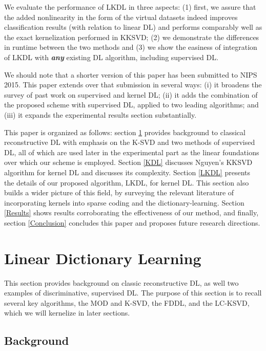 \documentclass[journal]{IEEEtran}
\begin{document}
We evaluate the performance of LKDL in three aspects: (1) first, we assure that the added nonlinearity in the form of the virtual datasets indeed improves classification results (with relation to linear DL) and performs comparably well as the exact kernelization performed in KKSVD; (2) we demonstrate the differences in runtime between the two methods and (3) we show the easiness of integration of LKDL with \textit{\textbf{any}} existing DL algorithm, including supervised DL.

We should note that a shorter version of this paper has been submitted to NIPS 2015. This paper extends over that submission in several ways: (i) it broadens the survey  of past work on supervised and kernel DL; (ii) it adds the combination of the proposed scheme with supervised DL, applied to two leading algorithms; and (iii) it expands the experimental results section substantially.

This paper is organized as follows: section \ref{linearDL} provides background to classical reconstructive DL with emphasis on the K-SVD and two methods of supervised DL, all of which are used later in the experimental part as the linear foundations over which our scheme is employed.  Section \ref{KDL} discusses Nguyen's KKSVD algorithm for kernel DL and discusses its complexity. Section \ref{LKDL} presents the details of our proposed algorithm, LKDL, for kernel DL. This section also builds a wider picture of this field, by surveying the relevant literature of incorporating kernels into sparse coding and the dictionary-learning.
Section \ref{Results} shows results corroborating the effectiveness of our method, and finally, section \ref{Conclusion} concludes this paper and proposes future research directions.


\section{Linear Dictionary Learning} \label{linearDL}

This section provides background on classic reconstructive DL, as well two examples of discriminative, supervised DL. The purpose of this section is to recall several key algorithms, the MOD and K-SVD, the FDDL, and the LC-KSVD, which we will kernelize in later sections.

\subsection{Background} \label{SS:Background}
\end{document}
